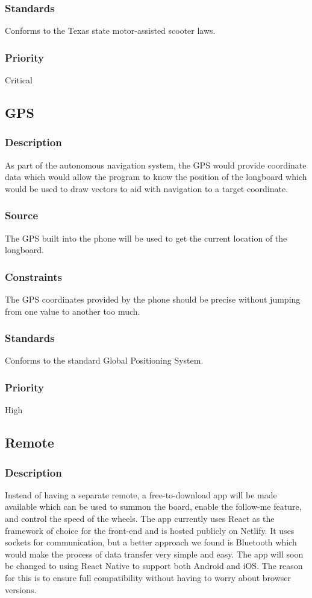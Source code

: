 \subsubsection{Standards}
Conforms to the Texas state motor-assisted scooter laws.
\subsubsection{Priority}
Critical

\subsection{GPS}
\subsubsection{Description}
As part of the autonomous navigation system, the GPS would provide coordinate data which would allow the program to know the position of the longboard which would be used to draw vectors to aid with navigation to a target coordinate.
\subsubsection{Source}
The GPS built into the phone will be used to get the current location of the longboard.
\subsubsection{Constraints}
The GPS coordinates provided by the phone should be precise without jumping from one value to another too much.
\subsubsection{Standards}
Conforms to the standard Global Positioning System.
\subsubsection{Priority}
High

\subsection{Remote}
\subsubsection{Description}
Instead of having a separate remote, a free-to-download app will be made available which can be used to summon the board, enable the follow-me feature, and control the speed of the wheels. The app currently uses React as the framework of choice for the front-end and is hosted publicly on Netlify. It uses sockets for communication, but a better approach we found is Bluetooth which would make the process of data transfer very simple and easy. The app  will soon be changed to using React Native to support both Android and iOS. The reason for this is to ensure full compatibility without having to worry about browser versions.
